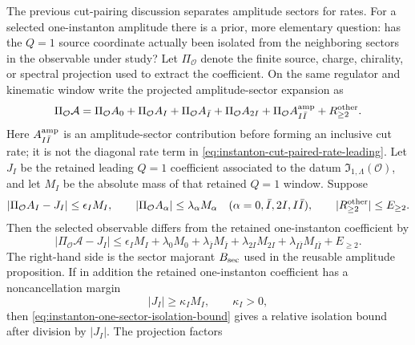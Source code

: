 \begin{controlledapproximation}
\label{ca:one-instanton-sector-isolation-bound}
The previous cut-pairing discussion separates amplitude sectors for rates.
For a selected one-instanton amplitude there is a prior, more elementary
question: has the \(Q=1\) source coordinate actually been isolated from the
neighboring sectors in the observable under study?  Let \(\Pi_{\mathcal O}\)
denote the finite source, charge, chirality, or spectral projection used to
extract the coefficient.  On the same regulator and kinematic window write
the projected amplitude-sector expansion as
\begin{equation}
  \Pi_{\mathcal O}\mathcal A
  =
  \Pi_{\mathcal O}A_0
  +
  \Pi_{\mathcal O}A_I
  +
  \Pi_{\mathcal O}A_{\bar I}
  +
  \Pi_{\mathcal O}A_{2I}
  +
  \Pi_{\mathcal O}A_{I\bar I}^{\rm amp}
  +
  R_{\ge2}^{\rm other}.
  \label{eq:instanton-one-sector-isolation-expansion}
\end{equation}
Here \(A_{I\bar I}^{\rm amp}\) is an amplitude-sector contribution before
forming an inclusive cut rate; it is not the diagonal rate term in
\eqref{eq:instanton-cut-paired-rate-leading}.  Let \(J_I\) be the retained
leading \(Q=1\) coefficient associated to the datum
\(\mathfrak I_{1,\Lambda}(\mathcal O)\), and let
\(M_I\) be the absolute mass of that retained \(Q=1\) window.  Suppose
\begin{equation}
  \left|\Pi_{\mathcal O}A_I-J_I\right|
  \le
  \epsilon_I M_I,
  \qquad
  \left|\Pi_{\mathcal O}A_\alpha\right|
  \le
  \lambda_\alpha M_\alpha
  \quad
  (\alpha=0,\bar I,2I,I\bar I),
  \qquad
  |R_{\ge2}^{\rm other}|\le E_{\ge2}.
  \label{eq:instanton-one-sector-isolation-hypotheses}
\end{equation}
Then the selected observable differs from the retained one-instanton
coefficient by
\begin{equation}
  \left|\Pi_{\mathcal O}\mathcal A-J_I\right|
  \le
  \epsilon_I M_I
  +
  \lambda_0M_0
  +
  \lambda_{\bar I}M_{\bar I}
  +
  \lambda_{2I}M_{2I}
  +
  \lambda_{I\bar I}M_{I\bar I}
  +
  E_{\ge2}.
  \label{eq:instanton-one-sector-isolation-bound}
\end{equation}
The right-hand side is the sector majorant \(B_{\rm sec}\) used in the
reusable amplitude proposition.
If in addition the retained one-instanton coefficient has a noncancellation
margin
\[
  |J_I|\ge\kappa_I M_I,\qquad \kappa_I>0,
\]
then \eqref{eq:instanton-one-sector-isolation-bound} gives a relative
isolation bound after division by \(|J_I|\).  The projection factors

\end{controlledapproximation}
